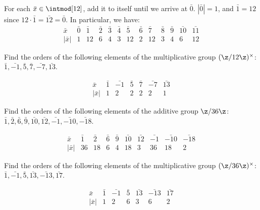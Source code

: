 \begin{problems}
    \begin{sol}
        For each $\bar x \in \intmod[12]$, add it to itself until we arrive at $\bar 0$. $|\bar 0| = 1$, and $\bar 1 = 12$ since $12 \cdot \bar 1 = \bar{12} = \bar 0$. In particular, we have:
        $$\begin{array}{c|c|c|c|c|c|c|c|c|c|c|c|c}
            \bar x & \bar 0 & \bar 1 & \bar 2 & \bar 3 & \bar 4 & \bar 5 & \bar 6 & \bar 7 & \bar 8 & \bar 9 & \bar{10} & \bar{11} \\
            \hline
            |\bar x| & 1 & 12 & 6 & 4 & 3 & 12 & 2 & 12 & 3 & 4 & 6 & 12
        \end{array}$$
    \end{sol}
    \item Find the orders of the following elements of the multiplicative group $(\z/12\z)^{\times}$: $\bar{1}, \bar{-1}, \bar{5}, \bar{7}, \bar{-7}, \bar{13}$.
    \begin{sol}
        $$\begin{array}{c|c|c|c|c|c|c}
            \bar x & \bar{1} & \bar{-1} & \bar{5} & \bar{7} & \bar{-7} & \bar{13} \\
            \hline
            |\bar x| & 1 & 2 & 2 & 2 & 2 & 1
        \end{array}$$
    \end{sol}
    \item Find the orders of the following elements of the additive group $\z/36\z$: $\bar{1}, \bar{2}, \bar{6}, \bar{9}, \bar{10}, \bar{12}, \bar{-1}, \bar{-10}, \bar{-18}$.
    \begin{sol}
        $$\begin{array}{c|c|c|c|c|c|c|c|c|c}
             \bar x & \bar 1 & \bar 2 & \bar 6 & \bar 9 & \bar{10} & \bar{12} & \bar{-1} & \bar{-10} & \bar{-18} \\
             \hline
             |\bar x| & 36 & 18 & 6 & 4 & 18 & 3 & 36 & 18 & 2
        \end{array}$$
    \end{sol}
    \item Find the orders of the following elements of the multiplicative group $(\z/36\z)^{\times}$: $\bar{1}, \bar{-1}, \bar{5}, \bar{13}, \bar{-13}, \bar{17}$.
    \begin{sol}
        $$\begin{array}{c|c|c|c|c|c|c}
            \bar x & \bar 1 & \bar{-1} & \bar 5 & \bar{13} & \bar{-13} & \bar{17} \\
            \hline
            |\bar x| & 1 & 2 & 6 & 3 & 6 & 2

\end{array}$$
\end{sol}
\end{problems}
